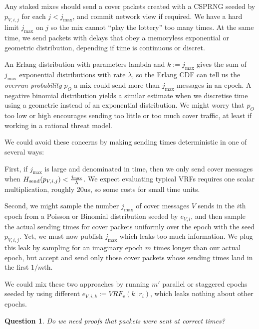 ﻿\documentclass{sig-alternate-hotpets}
\newtheorem{question}{Question}
\newcommand{\microseconds}{us}
\begin{document}
Any staked mixes should send a cover packets created with a CSPRNG seeded by $p_{V,i,j}$ for each $j < j_{\max}$, and commit network view if required.  We have a hard limit $j_{\max}$ on $j$ so the mix cannot ``play the lottery'' too many times.  At the same time, we send packets with delays that obey a memoryless exponential or geometric distribution, depending if time is continuous or discret. 

An Erlang distribution with parameters lambda and $k := j_{\max}$ gives the sum of $j_{\max}$ exponential distributions with rate $\lambda$, so the Erlang CDF can tell us the {\em overrun probability} $p_O$ a mix could send more than $j_{\max}$ messages in an epoch.  A negative binomial distribution yields a similar estimate when we discretise time using a geometric instead of an exponential distribution.  We might worry that $p_O$ too low or high encourages sending too little or too much cover traffic, at least if working in a rational threat model.  

We could avoid these concerns by making sending times deterministic in
one of several ways:

First, if $j_{\max}$ is large and denominated in time, then we only send 
cover messages when $H_{\mathrm{send}}(p_{V,i,j}) < {j_{\max} \over \lambda}$. 
We expect evaluating typical VRFs requires one scalar multiplication,
roughly 20\microseconds, so some costs for small time units.

Second, we might sample the number $j_{\max}$ of cover messages $V$
sends in the $i$th epoch from a Poisson or Binomial distribution seeded
by $e_{V,i}$, and then sample the actual sending times for cover packets
uniformly over the epoch with the seed $p_{V,i,j}$.  Yet, we must now
publish $j_{\max}$ which leaks too much information.  We plug this leak
by sampling for an imaginary epoch $m$ times longer than our actual
epoch, but accept and send only those cover packets whose sending times
land in the first $1/m$th.  

We could mix these two approaches by running $m'$ parallel or staggered
epochs seeded by using different $e_{V,i,k} := VRF_v(k || r_i)$, which
leaks nothing about other epochs.  

\begin{question}
Do we need proofs that packets were sent at correct times?
\end{question}
\end{document}
